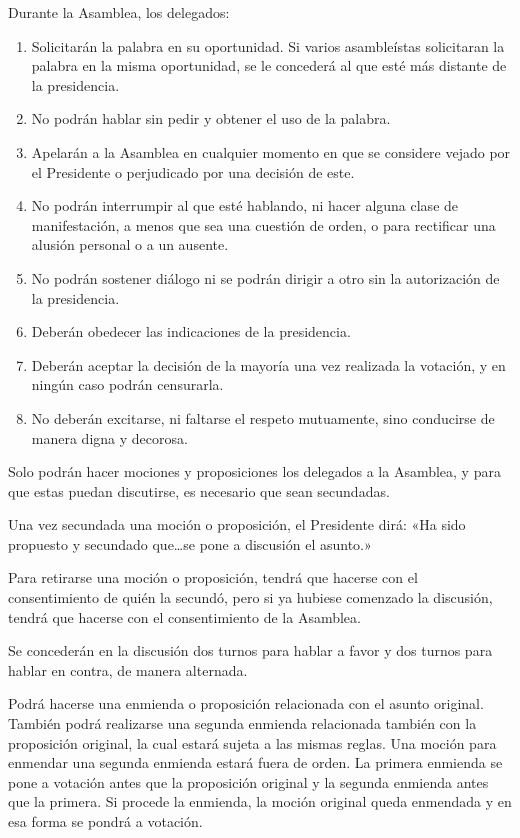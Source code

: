 \article
Durante la Asamblea, los delegados:
\begin{enumerate}[label=\alph*),noitemsep]
    \item Solicitarán la palabra en su oportunidad. Si varios asambleístas solicitaran la palabra en la misma oportunidad, se le concederá al que esté más distante de la presidencia.
    \item No podrán hablar sin pedir y obtener el uso de la palabra.
    \item Apelarán a la Asamblea en cualquier momento en que se considere vejado por el Presidente o perjudicado por una decisión de este.
    \item No podrán interrumpir al que esté hablando, ni hacer alguna clase de manifestación, a menos que sea una cuestión de orden, o para rectificar una alusión personal o a un ausente.
    \item No podrán sostener diálogo ni se podrán dirigir a otro sin la autorización de la presidencia.
    \item Deberán obedecer las indicaciones de la presidencia.
    \item Deberán aceptar la decisión de la mayoría una vez realizada la votación, y en ningún caso podrán censurarla.
    \item No deberán excitarse, ni faltarse el respeto mutuamente, sino conducirse de manera digna y decorosa.
\end{enumerate}


\article
Solo podrán hacer mociones y proposiciones los delegados a la Asamblea, y para que estas puedan discutirse, es necesario que sean secundadas.

\article
Una vez secundada una moción o proposición, el Presidente dirá: «Ha sido propuesto y secundado que\ldots se pone a discusión el asunto.»

\article
Para retirarse una moción o proposición, tendrá que hacerse con el consentimiento de quién la secundó, pero si ya hubiese comenzado la discusión, tendrá que hacerse con el consentimiento de la Asamblea.

\article
Se concederán en la discusión dos turnos para hablar a favor y dos turnos para hablar en contra, de manera alternada.

\article
Podrá hacerse una enmienda o proposición relacionada con el asunto original. También podrá realizarse una segunda enmienda relacionada también con la proposición original, la cual estará sujeta a las mismas reglas. Una moción para enmendar una segunda enmienda estará fuera de orden. La primera enmienda se pone a votación antes que la proposición original y la segunda enmienda antes que la primera. Si procede la enmienda, la moción original queda enmendada y en esa forma se pondrá a votación.

